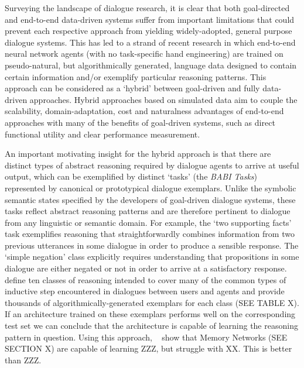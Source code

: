 \documentclass[11pt,letterpaper]{article}
\begin{document}
Surveying the landscape of dialogue research, it is clear that both goal-directed and end-to-end data-driven systems suffer from important limitations that could prevent each respective approach from yielding widely-adopted, general purpose dialogue systems. This has led to a strand of recent research in which end-to-end neural network agents (with no task-specific hand engineering) are trained on pseudo-natural, but algorithmically generated, language data designed to contain certain information and/or exemplify particular reasoning patterns. This approach can be considered as a `hybrid' between goal-driven and fully data-driven approaches. Hybrid approaches based on simulated data aim to couple the scalability, domain-adaptation, cost and naturalness advantages of end-to-end approaches with many of the benefits of goal-driven systems, such as direct functional utility and clear performance measurement.

An important motivating insight for the hybrid approach is that there are distinct types of abstract reasoning required by dialogue agents to arrive at useful output, which can be exemplified by distinct `tasks' (the \emph{BABI Tasks}) represented by canonical or prototypical dialogue exemplars. Unlike the symbolic semantic states specified by the developers of goal-driven dialogue systems, these tasks reflect abstract reasoning patterns and are therefore pertinent to dialogue from any linguistic or semantic domain. For example, the `two supporting facts' task exemplifies reasoning that straightforwardly combines information from two previous utterances in some dialogue in order to produce a sensible response. The `simple negation' class explicitly requires understanding that propositions in some dialogue are either negated or not in order to arrive at a satisfactory response.~ define ten classes of reasoning intended to cover many of the common types of inductive step encountered in dialogues between users and agents and provide thousands of algorithmically-generated exemplars for each class (SEE TABLE X). If an architecture trained on these exemplars performs well on the corresponding test set we can conclude that the architecture is capable of learning the reasoning pattern in question. Using this approach, ~ show that Memory Networks (SEE SECTION X) are capable of learning  ZZZ, but struggle with XX. This is better than ZZZ. 
\end{document}
